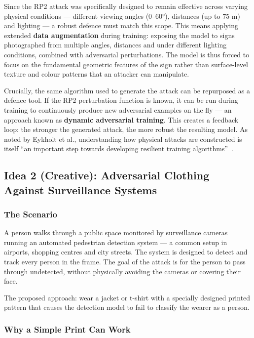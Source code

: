 \documentclass[12pt, a4paper]{article}
\begin{document}
Since the RP2 attack was specifically designed to remain effective across
varying physical conditions — different viewing angles (0--60°), distances
(up to 75 m) and lighting — a robust defence must match this scope.
This means applying extended \textbf{data augmentation} during training:
exposing the model to signs photographed from multiple angles, distances
and under different lighting conditions, combined with adversarial
perturbations. The model is thus forced to focus on the fundamental
geometric features of the sign rather than surface-level texture and
colour patterns that an attacker can manipulate.

Crucially, the same algorithm used to generate the attack can be repurposed
as a defence tool. If the RP2 perturbation function is known, it can be
run during training to continuously produce new adversarial examples on
the fly — an approach known as \textbf{dynamic adversarial training}.
This creates a feedback loop: the stronger the generated attack, the more
robust the resulting model. As noted by Eykholt et al., understanding how
physical attacks are constructed is itself ``an important step towards
developing resilient training algorithms''~\cite{eykholt2017}.

\subsection*{Idea 2 (Creative): Adversarial Clothing Against Surveillance Systems}

\subsubsection*{The Scenario}

A person walks through a public space monitored by surveillance cameras
running an automated pedestrian detection system — a common setup in
airports, shopping centres and city streets. The system is designed to
detect and track every person in the frame. The goal of the attack is
for the person to pass through undetected, without physically avoiding
the cameras or covering their face.

The proposed approach: wear a jacket or t-shirt with a specially designed
printed pattern that causes the detection model to fail to classify the
wearer as a person.

\subsubsection*{Why a Simple Print Can Work}
\end{document}
